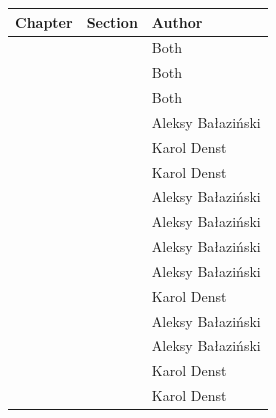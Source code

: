 \begin{table}[!htb]
    \centering
    \begin{tabular}{|l|l|l|}
        \hline
        Chapter                               & Section                                     & Author            \\ \hline
        \nameref{ch:introduction}             &                                             & Both              \\
        \nameref{sec:division_of_work}        &                                             & Both              \\
        \nameref{ch:functional_specification} &                                             & Both              \\
        \nameref{ch:theoretical_foundations}  & \nameref{sec:non_euclidean_geometry}        & Aleksy Bałaziński \\
        \nameref{ch:theoretical_foundations}  & \nameref{sec:theory_theory_marching_cubes}  & Karol Denst       \\
        \nameref{ch:theoretical_foundations}  & \nameref{sec:theory_theory_models}          & Karol Denst       \\
        \nameref{ch:theoretical_foundations}  & \nameref{sec:theory_theory_day_night_cycle} & Aleksy Bałaziński \\
        \nameref{ch:theoretical_foundations}  & \nameref{sec:theory_theory_lighting}        & Aleksy Bałaziński \\
        \nameref{ch:implementation}           & \nameref{sec:technologies_selection}        & Aleksy Bałaziński \\
        \nameref{ch:implementation}           & \nameref{sec:game_objects_management}       & Aleksy Bałaziński \\
        \nameref{ch:implementation}           & \nameref{sec:implementation_terrain}        & Karol Denst       \\
        \nameref{ch:implementation}           & \nameref{sec:chunk-worker}                  & Aleksy Bałaziński \\
        \nameref{ch:implementation}           & \nameref{sec:implementation_rendering}      & Aleksy Bałaziński \\
        \nameref{ch:implementation}           & \nameref{sec:two_dimensional_graphics}      & Karol Denst       \\
        \nameref{ch:testing}                  &                                             & Karol Denst       \\

\end{tabular}
\end{table}
